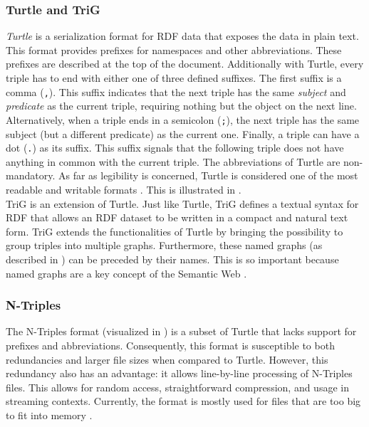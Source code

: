 \subsubsection{Turtle and TriG}
\emph{Turtle} is a serialization format for RDF data that exposes the data in plain text. This format provides prefixes for namespaces and other abbreviations. These prefixes are described at the top of the document. Additionally with Turtle, every triple has to end with either one of three defined suffixes. The first suffix is a comma (\texttt{,}). This suffix indicates that the next triple has the same \emph{subject} and \emph{predicate} as the current triple, requiring nothing but the object on the next line. Alternatively, when a triple ends in a semicolon (\texttt{;}), the next triple has the same subject (but a different predicate) as the current one. Finally, a triple can have a dot (\texttt{.}) as its suffix. This suffix signals that the following triple does not have anything in common with the current triple. The abbreviations of Turtle are non-mandatory. As far as legibility is concerned, Turtle is considered one of the most readable and writable formats \cite{beckett2014rdfturtle}. This is illustrated in .\\

\noindent TriG is an extension of Turtle. Just like Turtle, TriG defines a textual syntax for RDF that allows an RDF dataset to be written in a compact and natural text form. TriG extends the functionalities of Turtle by bringing the possibility to group triples into multiple graphs. Furthermore, these named graphs (as described in ) can be preceded by their names. This is so important because named graphs are a key concept of the Semantic Web \cite{trig}. 



\subsubsection{N-Triples}
The N-Triples format (visualized in ) is a subset of Turtle that lacks support for prefixes and abbreviations. Consequently, this format is susceptible to both redundancies and larger file sizes when compared to Turtle. However, this redundancy also has an advantage: it allows line-by-line processing of N-Triples files. This allows for random access, straightforward compression, and usage in streaming contexts. Currently, the format is mostly used for files that are too big to fit into memory \cite{beckett2014rdfntriples}.

